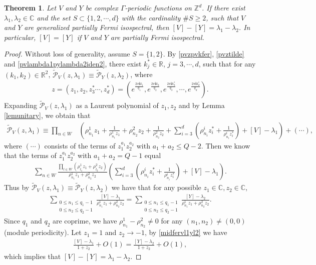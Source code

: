 \documentclass[12pt,letterpaper]{amsart}
\newtheorem{theorem}{Theorem}[section]
\def\R{{\mathbb R}}
\def\C{{\mathbb C}}
\def\Z{{\mathbb Z}}
\begin{document}
\begin{theorem}\label{v-yequlambda1-2}
Let $V$ and $Y$ be complex $\Gamma$-periodic functions on $\Z^d$. If there exist $\lambda_1,\lambda_2\in\C$ and the set $S\subset\{1,2,\cdots,d\}$ with the cardinality $\# S\geq 2$, such that $V$ and $Y$ are generalized partially Fermi isospectral,
then $[V]-[Y]=\lambda_1-\lambda_2$. {In particular, $[V]=[Y]$ if $V$ and $Y$ are  partially Fermi isospectral.}
\end{theorem}
\begin{proof} Without loss of generality, assume $S=\{1,2\}$.
By \eqref{pvzpvkfer}, \eqref{pvztilde} and \eqref{pvlambda1pylambda2iden2}, there exist $k_j^*\in\R$, $j=3,\cdots,d$, such that for any $(k_1,k_2)\in\R^2$,
$\tilde{\mathcal{P}}_V(z,\lambda_1)\equiv\tilde{\mathcal{P}}_Y(z,\lambda_2)$, where
\begin{align}
z=(z_1,z_2,z_3^*\cdots,z_d^*)=\left(e^{\frac{2\pi\mathbf{i} k_1}{q_1}},e^{\frac{2\pi\mathbf{i} k_{2}}{q_{2}}},e^{\frac{2\pi\mathbf{i} k_{3}^*}{q_{3}}},\cdots,e^{\frac{2\pi\mathbf{i} k_d^*}{q_d}}\right).\nonumber
\end{align}
Expanding $\tilde{\mathcal{P}}_V(z,\lambda_1)$ as a Laurent polynomial of $z_1,z_2$ and by Lemma \ref{lemunitary}, we obtain that
{\small\begin{align}
\tilde{\mathcal{P}}_V(z,\lambda_1)\equiv \prod_{n\in W}&\left(\rho^1_{n_1}z_1+\frac{1}{\rho^1_{n_1}z_1}+\rho^2_{n_2}z_2+\frac{1}{\rho^2_{n_2}z_2}+\sum_{i=3}^d\left(\rho^i_{n_i}z_i^*+\frac{1}{\rho^i_{n_i}z_i^*}\right)+[V]-\lambda_1\right)+(\cdots),\nonumber
\end{align}}where $(\cdots)$ consists of the terms of $z_1^{a_1}z_2^{a_2}$ with $a_1+a_2\leq Q-2$. Then we know that the terms of $z_1^{a_1}z_2^{a_2}$ with $a_1+a_2=Q-1$ equal
\begin{align}
\sum_{n\in W}\frac{\prod_{l\in W}\left(\rho^1_{l_1}z_1+ \rho^2_{l_2}z_2\right)}{\rho^1_{n_1}z_1+\rho^2_{n_2}z_2}\left(\sum_{i=3}^d\left(\rho^i_{n_i}z_i^*+\frac{1}{\rho^i_{n_i}z_i^*}\right)+[V]-\lambda_1\right).\nonumber
\end{align}
Thus by $\tilde{\mathcal{P}}_V(z,\lambda_1)\equiv\tilde{\mathcal{P}}_Y(z,\lambda_2)$ we have that for any possible $z_1\in\C,z_2\in\C$,
\begin{align}
\sum_{\substack{0\leq n_1\leq q_1-1\\0\leq n_2\leq q_2-1}}\frac{[V]-\lambda_1}{\rho^1_{n_1}z_1+\rho^2_{n_2}z_2}=\sum_{\substack{0\leq n_1\leq q_1-1\\0\leq n_2\leq q_2-1}}\frac{[Y]-\lambda_2}{\rho^1_{n_1}z_1+\rho^2_{n_2}z_2}.\label{midfervl1yl2}
\end{align}
Since $q_1$ and $q_2$ are coprime,  we have $\rho^1_{n_1}-\rho^2_{n_2}\neq 0$ for any $(n_1,n_2)\neq (0,0)$ (module periodicity). Let $z_1=1$ and $z_2\to-1$, by \eqref{midfervl1yl2} we have
\begin{align}
\frac{[V]-\lambda_1}{1+z_2}+O(1)=\frac{[Y]-\lambda_2}{1+z_2}+O(1),\nonumber
\end{align}
which implies that $[V]-[Y]=\lambda_1-\lambda_2$.
\end{proof}
\end{document}
